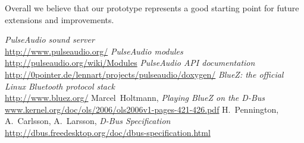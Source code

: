 \documentclass[conference]{IEEEtran}
\begin{document}
Overall we believe that our prototype represents a good starting point for future extensions and improvements.


\vspace{4mm}
\begin{thebibliography}{1}
	\emph{PulseAudio sound server} \\
	\url{http://www.pulseaudio.org/}
	\emph{PulseAudio modules} \\
	\url{http://pulseaudio.org/wiki/Modules}
	\emph{PulseAudio API documentation} \\
	\url{http://0pointer.de/lennart/projects/pulseaudio/doxygen/}
	\emph{BlueZ: the official Linux Bluetooth protocol stack} \\
	\url{http://www.bluez.org/}
	Marcel~Holtmann,
	\emph{Playing BlueZ on the D-Bus} \\
	\url{www.kernel.org/doc/ols/2006/ols2006v1-pages-421-426.pdf}
	H.~Pennington, A.~Carlsson, A.~Larsson,
	\emph{D-Bus Specification} \\
	\url{http://dbus.freedesktop.org/doc/dbus-specification.html}
\end{thebibliography}
\end{document}
